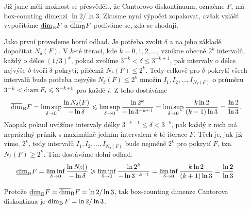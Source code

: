 \begin{example}\label{ex:cantorovo-diskontinuum}
    Již jsme měli možnost se přesvědčit, že Cantorovo diskontinuum, označme $F$, má box-counting dimenzi $\ln{2}/\ln{3}$. Zkusme nyní výpočet zopakovat, avšak vzlášť vypočítáme $\underline{\dim}_\text{B}{F}$ a $\overline{\dim}_\text{B}{F}$ podíváme se, zda se shodují.

    Jako první provedeme horní odhad. Je potřeba zvolit $\delta$ a na jeho základě dopočítat $N_\delta(F)$. V $k$-té iteraci, kde $k=0,1,2,\ldots$, vznikne obecně $2^k$ intervalů, každý o délce $(1/3)^k$, pokud zvolíme $3^{-k}<\delta\leqslant 3^{-k+1}$, pak intervaly o délce nejvýše $\delta$ tvoří $\delta$ pokrytí, přičemž $N_\delta(F)\leqslant 2^k$. Tedy celkově pro $\delta$-pokrytí všech intervalů bude potřeba nejvýše $N_\delta(F)\leqslant 2^k$ množin $I_1,I_2,\ldots,I_{N_\delta(F)}$ o průměru $3^{-k}<\operatorname{diam}{F_i}\leqslant 3^{-k+1}$ pro každé $i$. Z toho dostáváme
    \[\overline{\dim}_\text{B}{F}=\limsup_{\delta\to 0}\dfrac{\ln{N_\delta(F)}}{-\ln{\delta}}\leqslant\limsup_{\delta\to 0}\dfrac{\ln{2^k}}{-\ln{3^{-k+1}}}=\limsup_{\delta\to 0}\dfrac{k\ln{2}}{(k-1)\ln{3}}=\dfrac{\ln{2}}{\ln{3}}.\]
    Naopak pokud uvážíme intervaly délky $3^{-k-1}\leqslant\delta<3^{-k}$, pak každý z nich má neprázdný průnik s maximálně jedním intervalem $k$-té iterace $F$. Těch je, jak již víme, $2^k$, tedy intervalů $I_1,I_2,\ldots,I_{N_\delta(F)}$ bude nejméně $2^k$ pro pokrytí $F$, tzn. $N_\delta(F)\geqslant 2^k$. Tím dostáváme dolní odhad:
    \[\underline{\dim}_\text{B}{F}=\liminf_{\delta\to 0}\dfrac{\ln{N_\delta()}}{-\ln{\delta}}\geqslant\liminf_{\delta\to 0}\dfrac{\ln{2^k}}{-\ln{3^{-k-1}}}=\liminf_{\delta\to 0}\dfrac{k\ln{2}}{(k+1)\ln{3}}=\dfrac{\ln{2}}{\ln{3}}.\]

    Protože $\underline{\dim}_\text{B}{F}=\overline{\dim}_\text{B}{F}=\ln{2}/\ln{3}$, tak box-counting dimenze Cantorova diskontinua je $\operatorname{dim_B}{F}=\ln{2}/\ln{3}$.
\end{example}